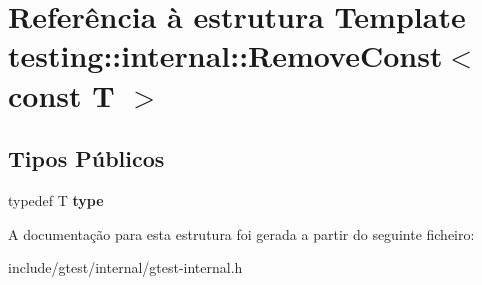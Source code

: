 \hypertarget{structtesting_1_1internal_1_1RemoveConst_3_01const_01T_01_4}{\section{Referência à estrutura Template testing\-:\-:internal\-:\-:Remove\-Const$<$ const T $>$}
\label{structtesting_1_1internal_1_1RemoveConst_3_01const_01T_01_4}
}
\subsection*{Tipos Públicos}
\begin{DoxyCompactItemize}
\item 
\hypertarget{structtesting_1_1internal_1_1RemoveConst_3_01const_01T_01_4_ac88c6824d228ab05091e5a4f1c1a95fc}{typedef T {\bfseries type}}\label{structtesting_1_1internal_1_1RemoveConst_3_01const_01T_01_4_ac88c6824d228ab05091e5a4f1c1a95fc}

\end{DoxyCompactItemize}


A documentação para esta estrutura foi gerada a partir do seguinte ficheiro\-:\begin{DoxyCompactItemize}
\item 
include/gtest/internal/gtest-\/internal.\-h\end{DoxyCompactItemize}
